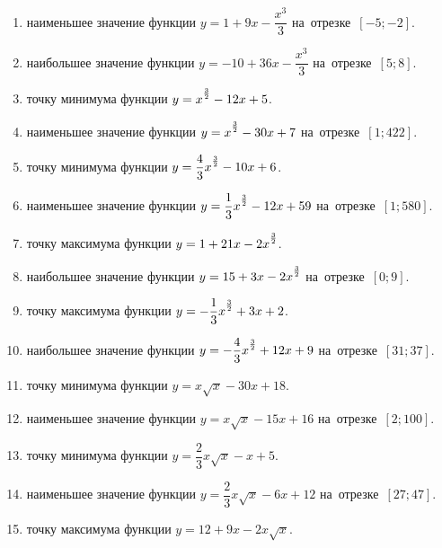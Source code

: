 \documentclass[a4paper,10pt]{article}
\begin{document}
\begin{enumerate}
\item {} наименьшее значение функции $y=1 +9x-\dfrac{x^3}{3}$ на~отрезке~$\left[-5;-2\right]$.

\item {} наибольшее значение функции $y=-10 +36x-\dfrac{x^3}{3}$ на~отрезке~$\left[5;8\right]$.

\item {} точку минимума функции $y=x\strut^{\frac{3}{2}} -12x+5$.

\item {} наименьшее значение функции $y=x\strut^{\frac{3}{2}} -30x+7$ на~отрезке~$\left[1;422\right]$.

\item {} точку минимума функции $y=\dfrac{4}{3}x\strut^{\frac{3}{2}} -10x+6$.

\item {} наименьшее значение функции $y=\dfrac{1}{3}x\strut^{\frac{3}{2}} -12x+59$ на~отрезке~$\left[1;580\right]$.

\item {} точку максимума функции $y=1+21x-2x\strut^{\frac{3}{2}}$.

\item {} наибольшее значение функции $y=15+3x-2x\strut^{\frac{3}{2}}$ на~отрезке~$\left[0;9\right]$.

\item {} точку максимума функции $y=-\dfrac{1}{3}x\strut^{\frac{3}{2}} +3x+2$.

\item {} наибольшее значение функции $y=-\dfrac{4}{3}x\strut^{\frac{3}{2}} +12x+9$ на~отрезке~$\left[31;37\right]$.

\item {} точку минимума функции $y=x\sqrt{x} -30x+18$.

\item {} наименьшее значение функции $y=x\sqrt{x} -15x+16$ на~отрезке~$\left[2;100\right]$.

\item {} точку минимума функции $y=\dfrac{2}{3}x\sqrt{x} -x+5$.

\item {} наименьшее значение функции $y=\dfrac{2}{3}x\sqrt{x} -6x+12$ на~отрезке~$\left[27;47\right]$.

\item {} точку максимума функции $y=12+9x -2x\sqrt{x}$.


\end{enumerate}
\end{document}
